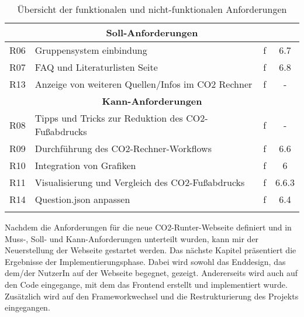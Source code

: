 \begin{longtable}{|c|l|c|c|}
    \multicolumn{4}{|c|}{\textbf{Soll-Anforderungen}}                                      \\ \hline

    R06                  & Gruppensystem einbindung                           & f  & 6.7   \\ \hline
    R07                  & FAQ und Literaturlisten Seite                      & f  & 6.8   \\ \hline
    R13                  & Anzeige von weiteren Quellen/Infos im CO2 Rechner  & f  & -     \\ \hline

    \multicolumn{4}{|c|}{\textbf{Kann-Anforderungen}}                                      \\ \hline

    R08                  & Tipps und Tricks zur Reduktion des CO2-Fußabdrucks & f  & -     \\ \hline
    R09                  & Durchführung des CO2-Rechner-Workflows             & f  & 6.6   \\ \hline
    R10                  & Integration von Grafiken                           & f  & 6     \\ \hline
    R11                  & Visualisierung und Vergleich des CO2-Fußabdrucks   & f  & 6.6.3 \\ \hline
    R14                  & Question.json anpassen                             & f  & 6.4   \\ \hline
    \caption{Übersicht der funktionalen und nicht-funktionalen Anforderungen}
    \label{table:definied-tasks}
\end{longtable}


Nachdem die Anforderungen für die neue CO2-Runter-Webseite definiert und in Muss-, Soll- und Kann-Anforderungen unterteilt wurden, kann mir der Neuerstellung der Webseite gestartet werden.
Das nächste Kapitel präsentiert die Ergebnisse der Implementierungsphase.
Dabei wird sowohl das Enddesign, das dem/der NutzerIn auf der Webseite begegnet, gezeigt. Andererseits wird auch auf den Code eingegange, mit dem das Frontend erstellt und implementiert wurde.
Zusätzlich wird auf den Frameworkwechsel und die Restrukturierung des Projekts eingegangen.
